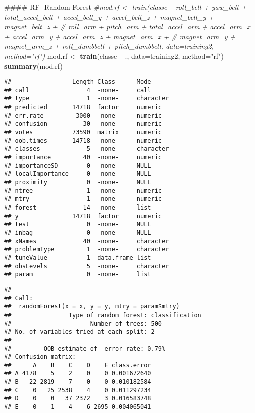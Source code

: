 \documentclass[]{article}
\newenvironment{Shaded}{\begin{snugshade}}{\end{snugshade}}
\newcommand{\KeywordTok}[1]{\textcolor[rgb]{0.13,0.29,0.53}{\textbf{{#1}}}}
\newcommand{\DataTypeTok}[1]{\textcolor[rgb]{0.13,0.29,0.53}{{#1}}}
\newcommand{\StringTok}[1]{\textcolor[rgb]{0.31,0.60,0.02}{{#1}}}
\newcommand{\CommentTok}[1]{\textcolor[rgb]{0.56,0.35,0.01}{\textit{{#1}}}}
\newcommand{\NormalTok}[1]{{#1}}
\begin{document}
\begin{Shaded}
\begin{Highlighting}[]
\NormalTok{#### RF- Random Forest}
\CommentTok{#mod.rf <- train(classe ~ roll_belt + yaw_belt + total_accel_belt + accel_belt_y + accel_belt_z + magnet_belt_y + magnet_belt_z +}
\CommentTok{#                              roll_arm + pitch_arm + total_accel_arm + accel_arm_x + accel_arm_y + accel_arm_z + magnet_arm_x +}
\CommentTok{#                              magnet_arm_y + magnet_arm_z + roll_dumbbell + pitch_dumbbell, data=training2, method="rf")}
\NormalTok{mod.rf <-}\StringTok{ }\KeywordTok{train}\NormalTok{(classe ~}\StringTok{ }\NormalTok{., }\DataTypeTok{data=}\NormalTok{training2, }\DataTypeTok{method=}\StringTok{"rf"}\NormalTok{)}
\KeywordTok{summary}\NormalTok{(mod.rf)}
\end{Highlighting}
\end{Shaded}

\begin{verbatim}
##                 Length Class      Mode     
## call                4  -none-     call     
## type                1  -none-     character
## predicted       14718  factor     numeric  
## err.rate         3000  -none-     numeric  
## confusion          30  -none-     numeric  
## votes           73590  matrix     numeric  
## oob.times       14718  -none-     numeric  
## classes             5  -none-     character
## importance         40  -none-     numeric  
## importanceSD        0  -none-     NULL     
## localImportance     0  -none-     NULL     
## proximity           0  -none-     NULL     
## ntree               1  -none-     numeric  
## mtry                1  -none-     numeric  
## forest             14  -none-     list     
## y               14718  factor     numeric  
## test                0  -none-     NULL     
## inbag               0  -none-     NULL     
## xNames             40  -none-     character
## problemType         1  -none-     character
## tuneValue           1  data.frame list     
## obsLevels           5  -none-     character
## param               0  -none-     list
\end{verbatim}

\begin{Shaded}
\end{Shaded}

\begin{verbatim}
## 
## Call:
##  randomForest(x = x, y = y, mtry = param$mtry) 
##                Type of random forest: classification
##                      Number of trees: 500
## No. of variables tried at each split: 2
## 
##         OOB estimate of  error rate: 0.79%
## Confusion matrix:
##      A    B    C    D    E class.error
## A 4178    5    2    0    0 0.001672640
## B   22 2819    7    0    0 0.010182584
## C    0   25 2538    4    0 0.011297234
## D    0    0   37 2372    3 0.016583748
## E    0    1    4    6 2695 0.004065041
\end{verbatim}
\end{document}
